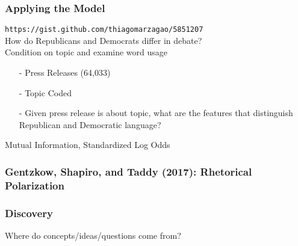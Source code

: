 \documentclass{beamer}
\numberwithin{equation}{section}
\begin{document}
\begin{frame}
\frametitle{Applying the Model}

{\tt https://gist.github.com/thiagomarzagao/5851207}\\

How do Republicans and Democrats differ in debate?\\

Condition on \alert{topic} and examine word usage\\

\begin{itemize}
\item[-] Press Releases (64,033)
\item[-] Topic Coded
\item[-] Given press release is about topic, what are the features that distinguish Republican and Democratic language?
\end{itemize}



\end{frame}
\begin{frame}

Mutual Information, Standardized Log Odds
\begin{center}
\end{center}


\end{frame}


\begin{frame}
\frametitle{Gentzkow, Shapiro, and Taddy (2017): Rhetorical Polarization}






\end{frame}


\begin{frame}
\frametitle{Discovery}

Where do concepts/ideas/questions come from? \pause 
\begin{itemize}
 \pause 
{} \pause 
{} \pause  \\
\pause{}\pause{} 

\end{itemize}




\end{frame}
\end{document}
